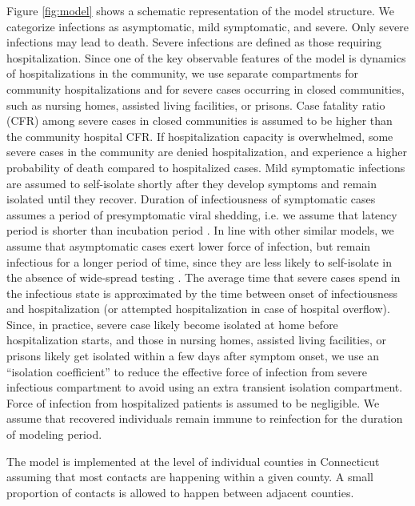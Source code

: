 \documentclass[11pt]{article}
\begin{document}
Figure \ref{fig:model} shows a schematic representation of the model structure. We categorize infections as asymptomatic, mild symptomatic, and severe. Only severe infections may lead to death. Severe infections are defined as those requiring hospitalization. Since one of the key observable features of the model is dynamics of hospitalizations in the community, we use separate compartments for community hospitalizations and for severe cases occurring in closed communities, such as nursing homes, assisted living facilities, or prisons. Case fatality ratio (CFR) among severe cases in closed communities is assumed to be higher than the community hospital CFR.  If hospitalization capacity is overwhelmed, some severe cases in the community are denied hospitalization, and experience a higher probability of death compared to hospitalized cases. Mild symptomatic infections are assumed to self-isolate shortly after they develop symptoms and remain isolated until they recover. Duration of infectiousness of symptomatic cases assumes a period of presymptomatic viral shedding, i.e. we assume that latency period is shorter than incubation period \citep{furukawa2020evidence}. In line with other similar models, we assume that asymptomatic cases exert lower force of infection, but remain infectious for a longer period of time, since they are less likely to self-isolate in the absence of wide-spread testing \citep{childs2020impact, salomon2020defining}.  The average time that severe cases spend in the infectious state is approximated by the time between onset of infectiousness and hospitalization (or attempted hospitalization in case of hospital overflow). Since, in practice, severe case likely become isolated at home before hospitalization starts, and those in nursing homes, assisted living facilities, or prisons likely get isolated within a few days after symptom onset, we use an ``isolation coefficient'' to reduce the effective force of infection from severe infectious compartment to avoid using an extra transient isolation compartment. Force of infection from hospitalized patients is assumed to be negligible. We assume that recovered individuals remain immune to reinfection for the duration of modeling period.

The model is implemented at the level of individual counties in Connecticut assuming that most contacts are happening within a given county. A small proportion of contacts is allowed to happen between adjacent counties. 
\end{document}
